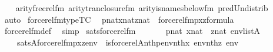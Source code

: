 \begin{isabellebody}
\ \ \isamarkupfalse%
\ arity{\isacharunderscore}{\kern0pt}frecrel{\isacharunderscore}{\kern0pt}fm\ arity{\isacharunderscore}{\kern0pt}tran{\isacharunderscore}{\kern0pt}closure{\isacharunderscore}{\kern0pt}fm\ arity{\isacharunderscore}{\kern0pt}is{\isacharunderscore}{\kern0pt}names{\isacharunderscore}{\kern0pt}below{\isacharunderscore}{\kern0pt}fm\ pred{\isacharunderscore}{\kern0pt}Un{\isacharunderscore}{\kern0pt}distrib\isanewline
\ \ \isamarkupfalse%
\ auto%
\endisatagproof
{\isafoldproof}%
%
\isadelimproof
\isanewline
%
\endisadelimproof
\isanewline
{}\isamarkupfalse%
\ forcerel{\isacharunderscore}{\kern0pt}fm{\isacharunderscore}{\kern0pt}type{\isacharbrackleft}{\kern0pt}TC{\isacharbrackright}{\kern0pt}{\isacharcolon}{\kern0pt}\isanewline
\ \ {\isachardoublequoteopen}{\isasymlbrakk}p{\isasymin}nat{\isacharsemicolon}{\kern0pt}x{\isasymin}nat{\isacharsemicolon}{\kern0pt}z{\isasymin}nat{\isasymrbrakk}\ {\isasymLongrightarrow}\ forcerel{\isacharunderscore}{\kern0pt}fm{\isacharparenleft}{\kern0pt}p{\isacharcomma}{\kern0pt}x{\isacharcomma}{\kern0pt}z{\isacharparenright}{\kern0pt}{\isasymin}formula{\isachardoublequoteclose}\isanewline
%
\isadelimproof
\ \ %
\endisadelimproof
%
\isatagproof
{}\isamarkupfalse%
\ forcerel{\isacharunderscore}{\kern0pt}fm{\isacharunderscore}{\kern0pt}def\ \isamarkupfalse%
\ simp%
\endisatagproof
{\isafoldproof}%
%
\isadelimproof
\isanewline
%
\endisadelimproof
\isanewline
\isanewline
{}\isamarkupfalse%
\ sats{\isacharunderscore}{\kern0pt}forcerel{\isacharunderscore}{\kern0pt}fm{\isacharcolon}{\kern0pt}\isanewline
\ \ \isanewline
\ \ \ \ {\isachardoublequoteopen}p{\isasymin}nat{\isachardoublequoteclose}\ {\isachardoublequoteopen}x{\isasymin}nat{\isachardoublequoteclose}\ \ {\isachardoublequoteopen}z{\isasymin}nat{\isachardoublequoteclose}\ {\isachardoublequoteopen}env{\isasymin}list{\isacharparenleft}{\kern0pt}A{\isacharparenright}{\kern0pt}{\isachardoublequoteclose}\isanewline
\ \ \isanewline
\ \ \ \ {\isachardoublequoteopen}sats{\isacharparenleft}{\kern0pt}A{\isacharcomma}{\kern0pt}forcerel{\isacharunderscore}{\kern0pt}fm{\isacharparenleft}{\kern0pt}p{\isacharcomma}{\kern0pt}x{\isacharcomma}{\kern0pt}z{\isacharparenright}{\kern0pt}{\isacharcomma}{\kern0pt}env{\isacharparenright}{\kern0pt}\ {\isasymlongleftrightarrow}\ is{\isacharunderscore}{\kern0pt}forcerel{\isacharparenleft}{\kern0pt}{\isacharhash}{\kern0pt}{\isacharhash}{\kern0pt}A{\isacharcomma}{\kern0pt}nth{\isacharparenleft}{\kern0pt}p{\isacharcomma}{\kern0pt}env{\isacharparenright}{\kern0pt}{\isacharcomma}{\kern0pt}nth{\isacharparenleft}{\kern0pt}x{\isacharcomma}{\kern0pt}\ env{\isacharparenright}{\kern0pt}{\isacharcomma}{\kern0pt}nth{\isacharparenleft}{\kern0pt}z{\isacharcomma}{\kern0pt}\ env{\isacharparenright}{\kern0pt}{\isacharparenright}{\kern0pt}{\isachardoublequoteclose}\isanewline

\end{isabellebody}
